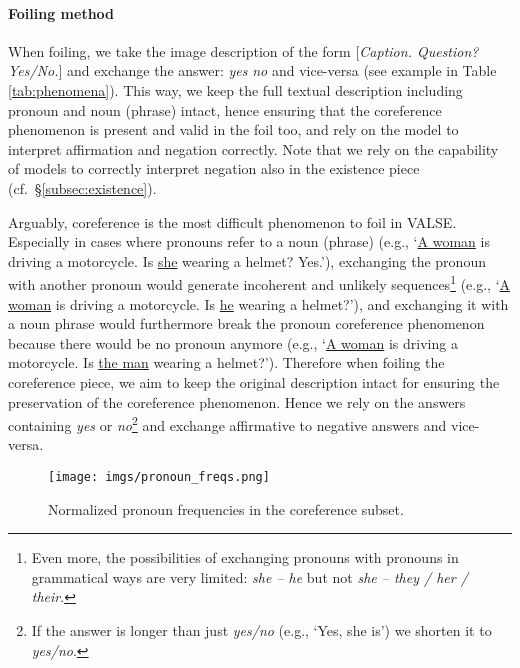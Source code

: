 \documentclass[11pt]{article}
\newcommand{\dataset}{VALSE}
\begin{document}
\paragraph{Foiling method}
When foiling, we take the image description of the form [\emph{Caption. Question? Yes/No.}] and exchange the answer: \emph{yes} \textrightarrow \emph{no} and vice-versa (see example in Table \ref{tab:phenomena}). This way, we keep the full textual description including pronoun and noun (phrase) intact, hence ensuring that the coreference phenomenon is present and valid in the foil too, and rely on the model to interpret affirmation and negation correctly. Note that we rely on the capability of models to correctly interpret negation also in the existence piece (cf.\ \S \ref{subsec:existence}).

Arguably, coreference is the most difficult phenomenon to foil in \dataset{}. Especially in cases where pronouns refer to a noun (phrase) (e.g., `\underline{A woman} is driving a motorcycle. Is \underline{she} wearing a helmet? Yes.'), exchanging the pronoun with another pronoun would generate incoherent and unlikely sequences\footnote{Even more, the possibilities of exchanging pronouns with pronouns in grammatical ways are very limited: \emph{she -- he} but not \emph{she -- they /  her / their}.} (e.g., `\underline{A woman} is driving a motorcycle. Is \underline{he} wearing a helmet?'), and exchanging it with a noun phrase would furthermore break the pronoun coreference phenomenon because there would be no pronoun anymore (e.g., `\underline{A woman} is driving a motorcycle. Is \underline{the man} wearing a helmet?'). Therefore when foiling the coreference piece, we aim to keep the original description intact for ensuring the preservation of the coreference phenomenon. Hence we rely on the answers containing \emph{yes} or \emph{no}\footnote{If the answer is longer than just \emph{yes/no} (e.g., `Yes, she is') we shorten it to \emph{yes/no}.} and exchange affirmative to negative answers and vice-versa.


\begin{figure}
    \centering
    \texttt{[image: imgs/pronoun\_freqs.png]}
    \caption{Normalized pronoun frequencies in the coreference subset.}
    \label{fig:coref-pron-freqs}
\end{figure}
\end{document}
